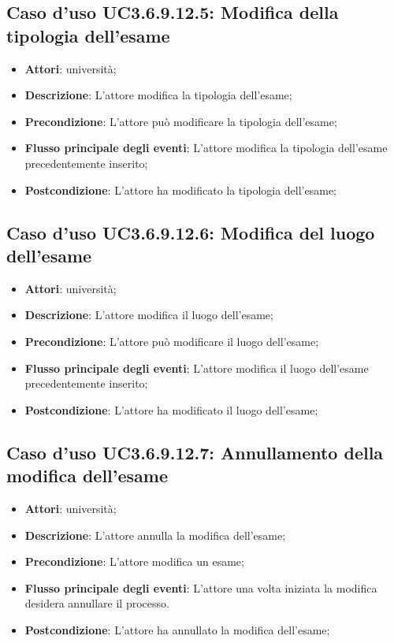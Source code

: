 \subsection{Caso d'uso \texorpdfstring{UC3.6.9.12.5}{UC3.6.9.12.5}: Modifica della tipologia dell’esame}
\begin{itemize}
\item \textbf{Attori}: università;
\item \textbf{Descrizione}: L'attore modifica la tipologia dell’esame;

\item \textbf{Precondizione}: L'attore può modificare la tipologia dell’esame;

\item \textbf{Flusso principale degli eventi}: L'attore modifica la tipologia dell’esame precedentemente inserito;

\item \textbf{Postcondizione}: L'attore ha modificato la tipologia dell’esame;

\end{itemize}
\subsection{Caso d'uso \texorpdfstring{UC3.6.9.12.6}{UC3.6.9.12.6}: Modifica del luogo dell’esame}
\begin{itemize}
\item \textbf{Attori}: università;
\item \textbf{Descrizione}: L'attore modifica il luogo dell’esame;

\item \textbf{Precondizione}: L'attore può modificare il luogo dell’esame;

\item \textbf{Flusso principale degli eventi}: L'attore modifica il luogo dell’esame precedentemente inserito;

\item \textbf{Postcondizione}: L'attore ha modificato il luogo dell’esame;

\end{itemize}
\subsection{Caso d'uso \texorpdfstring{UC3.6.9.12.7}{UC3.6.9.12.7}: Annullamento della modifica dell’esame}
\begin{itemize}
\item \textbf{Attori}: università;
\item \textbf{Descrizione}: L'attore annulla la modifica dell'esame;

\item \textbf{Precondizione}: L'attore modifica un esame;

\item \textbf{Flusso principale degli eventi}: L'attore una volta iniziata la modifica desidera annullare il processo.

\item \textbf{Postcondizione}: L'attore ha annullato la modifica dell'esame;

\end{itemize}
